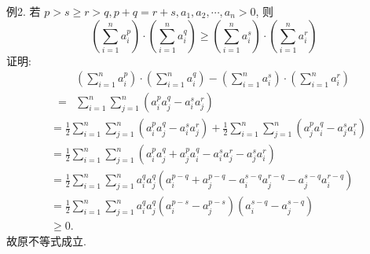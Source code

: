 例2. 若 $p>s \geqslant r>q, p+q=r+s, a_1, a_2, \cdots, a_n>0$, 则
$$
\left(\sum_{i=1}^n a_i^p\right) \cdot\left(\sum_{i=1}^n a_i^q\right) \geqslant\left(\sum_{i=1}^n a_i^s\right) \cdot\left(\sum_{i=1}^n a_i^r\right)
$$
证明:$$
\begin{aligned}
& \left(\sum_{i=1}^n a_i^p\right) \cdot\left(\sum_{i=1}^n a_i^q\right)-\left(\sum_{i=1}^n a_i^s\right) \cdot\left(\sum_{i=1}^n a_i^r\right) \\
= & \sum_{i=1}^n \sum_{j=1}^n\left(a_i^p a_j^q-a_i^s a_j^r\right)
\end{aligned}
$$
$$
\begin{aligned}
& =\frac{1}{2} \sum_{i=1}^n \sum_{j=1}^n\left(a_i^p a_j^q-a_i^s a_j^r\right)+\frac{1}{2} \sum_{i=1}^n \sum_{j=1}^n\left(a_j^p a_i^q-a_j^s a_i^r\right) \\
& =\frac{1}{2} \sum_{i=1}^n \sum_{j=1}^n\left(a_i^p a_j^q+a_j^p a_i^q-a_i^s a_j^r-a_j^s a_i^r\right) \\
& =\frac{1}{2} \sum_{i=1}^n \sum_{j=1}^n a_i^q a_j^q\left(a_i^{p-q}+a_j^{p-q}-a_i^{s-q} a_j^{r-q}-a_j^{s-q} a_i^{r-q}\right) \\
& =\frac{1}{2} \sum_{i=1}^n \sum_{j=1}^n a_i^q a_j^q\left(a_i^{p-s}-a_j^{p-s}\right)\left(a_i^{s-q}-a_j^{s-q}\right) \\
& \geqslant 0 .
\end{aligned}
$$
故原不等式成立.



